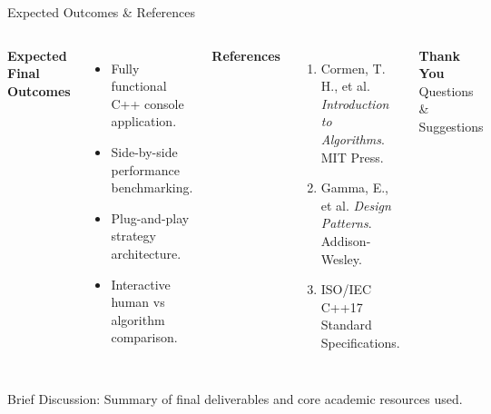 \documentclass[aspectratio=169,11pt]{beamer}
\newcommand{\smallnote}[1]{%
\vspace{0.08cm}
{\scriptsize\color{GEUGrey}#1}
}
\begin{document}
\begin{frame}{Expected Outcomes \& References}

\begin{columns}[T,totalwidth=\textwidth]


\textbf{\color{GEUBlue}Expected Final Outcomes}

\begin{itemize}\itemsep3pt
\item Fully functional C++ console application.
\item Side-by-side performance benchmarking.
\item Plug-and-play strategy architecture.
\item Interactive human vs algorithm comparison.
\end{itemize}


\textbf{\color{GEUBlue}References}

\begin{enumerate}\itemsep3pt
\item Cormen, T. H., et al. \textit{Introduction to Algorithms}. MIT Press.
\item Gamma, E., et al. \textit{Design Patterns}. Addison-Wesley.
\item ISO/IEC C++17 Standard Specifications.
\end{enumerate}

\vfill

\begin{center}

\colorbox{GEUBlue}{
\parbox{.78\textwidth}{
\centering
\color{white}
\textbf{Thank You}\\
Questions \& Suggestions
}}

\end{center}

\end{columns}

\vfill

\smallnote{
Brief Discussion: Summary of final deliverables and core academic resources used.
}

\end{frame}
\end{document}
